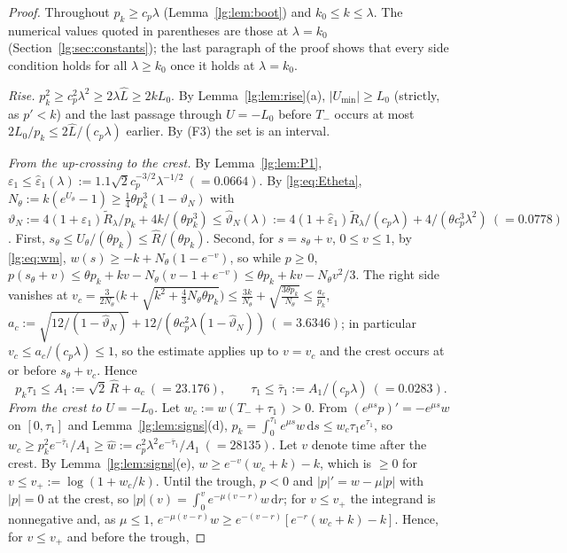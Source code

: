 \begin{proof}
Throughout $p_k\ge c_p\lambda$ (Lemma~\ref{lg:lem:boot}) and $k_0\le k\le\lambda$. The numerical values
quoted in parentheses are those at $\lambda=k_0$ (Section~\ref{lg:sec:constants}); the last paragraph of the proof
shows that every side condition holds for all $\lambda\ge k_0$ once it holds at $\lambda=k_0$.

\emph{Rise.} $p_k^2\ge c_p^2\lambda^2\ge2\lambda\hat L\ge2kL_0$. By Lemma~\ref{lg:lem:rise}(a), $|U_{\min}|\ge L_0$
(strictly, as $p'<k$) and the last passage through $U=-L_0$ before $T_-$ occurs at most
$2L_0/p_k\le2\hat L/(c_p\lambda)$ earlier. By (F3) the set is an interval.

\emph{From the up-crossing to the crest.} By Lemma~\ref{lg:lem:P1},
$\varepsilon_1\le\hat\varepsilon_1(\lambda):=1.1\sqrt2c_p^{-3/2}\lambda^{-1/2}\ (=0.0664)$. By \eqref{lg:eq:Etheta},
$N_\theta:=k(e^{U_\theta}-1)\ge\tfrac14\theta p_k^3(1-\vartheta_N)$ with
$\vartheta_N:=4(1+\varepsilon_1)\tilde R_\lambda/p_k+4k/(\theta p_k^3)\le
\hat\vartheta_N(\lambda):=4(1+\hat\varepsilon_1)\tilde R_\lambda/(c_p\lambda)+4/(\theta c_p^3\lambda^2)\ (=0.0778)$. First,
$s_\theta\le U_\theta/(\theta p_k)\le\hat R/(\theta p_k)$. Second, for $s=s_\theta+v$, $0\le v\le1$, by
\eqref{lg:eq:wm}, $w(s)\ge-k+N_\theta(1-e^{-v})$, so while $p\ge0$,
$p(s_\theta+v)\le\theta p_k+kv-N_\theta(v-1+e^{-v})\le\theta p_k+kv-N_\theta v^2/3$. The right side
vanishes at $v_c=\frac{3}{2N_\theta}\bigl(k+\sqrt{k^2+\tfrac43N_\theta\theta p_k}\bigr)
\le\frac{3k}{N_\theta}+\sqrt{\frac{3\theta p_k}{N_\theta}}\le\frac{a_c}{p_k}$,
$a_c:=\sqrt{12/(1-\hat\vartheta_N)}+12/(\theta c_p^2\lambda(1-\hat\vartheta_N))\ (=3.6346)$; in particular
$v_c\le a_c/(c_p\lambda)\le1$, so the estimate applies up to $v=v_c$ and the crest occurs at or before
$s_\theta+v_c$. Hence
\[
p_k\tau_1\le A_1:=\sqrt2\,\hat R+a_c\ (=23.176),\qquad \tau_1\le\bar\tau_1:=A_1/(c_p\lambda)\ (=0.0283).
\]
\emph{From the crest to $U=-L_0$.} Let $w_c:=w(T_-+\tau_1)>0$. From $(e^{\mu s}p)'=-e^{\mu s}w$ on
$[0,\tau_1]$ and Lemma~\ref{lg:lem:signs}(d), $p_k=\int_0^{\tau_1}e^{\mu s}w\,\mathrm ds\le w_c\tau_1e^{\tau_1}$,
so $w_c\ge p_k^2e^{-\bar\tau_1}/A_1\ge\hat w:=c_p^2\lambda^2e^{-\bar\tau_1}/A_1\ (=28135)$. Let $v$
denote time after the crest. By Lemma~\ref{lg:lem:signs}(e), $w\ge e^{-v}(w_c+k)-k$, which is $\ge0$ for
$v\le v_+:=\log(1+w_c/k)$. Until the trough, $p<0$ and $|p|'=w-\mu|p|$ with $|p|=0$ at the crest, so
$|p|(v)=\int_0^ve^{-\mu(v-r)}w\,\mathrm dr$; for $v\le v_+$ the integrand is nonnegative and, as $\mu\le1$,
$e^{-\mu(v-r)}w\ge e^{-(v-r)}[e^{-r}(w_c+k)-k]$. Hence, for $v\le v_+$ and before the trough,

\end{proof}

